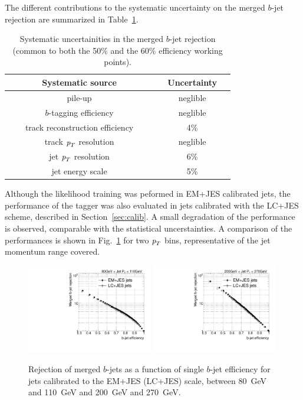 \vspace{3mm}
The different contributions to the systematic uncertainty on the merged $b$-jet rejection are summarized in Table~\ref{tb:systematics}.
\begin{table}[!hbt] %
\renewcommand{\arraystretch}{1.2}
\centering
\begin{tabular}{ | c | c |}
\hline
  ~~~~~~~Systematic source~~~~~~~ &~~Uncertainty~~\\ \hline
  pile-up          &  neglible     \\ 
  $b$-tagging efficiency     &  neglible     \\ 
  track reconstruction efficiency  &    4\%        \\ 
  track ${\emph{p}_{T}}$ resolution &  neglible     \\
  jet ${\emph{p}_{T}}$ resolution  &    6\%        \\  
  jet energy scale  &    5\%        \\ \hline 
\end{tabular}
\caption{Systematic uncertainities in the merged $b$-jet rejection (common to both the 50\% and the 60\% efficiency working points).}
\label{tb:systematics}
\end{table}


Although the likelihood training was peformed in EM+JES calibrated jets, the performance of the tagger was also evaluated in jets calibrated with the LC+JES scheme, described in Section~\ref{sec:calib}.  A small degradation of the performance is observed, comparable with the statistical uncerstainties. A comparison of the performances is shown in Fig.~\ref{fig:LCJES} for two ${\emph{p}_{T}}$ bins, representative of the jet momentum range covered. 

\begin{figure}[tp]
\centering
\includegraphics[width=0.49\textwidth]{FIGS/systematics/LlhoodKDE_ISO_LCcalibTest_rejvseff080.pdf}
\includegraphics[width=0.49\textwidth]{FIGS/systematics/LlhoodKDE_ISO_LCcalibTest_rejvseff200.pdf}
\caption{Rejection of merged $b$-jets as a function of single $b$-jet efficiency for jets calibrated to the EM+JES (LC+JES) scale, between 80~GeV and 110~GeV and 200~GeV and 270~GeV.}
\label{fig:LCJES}
\end{figure}


